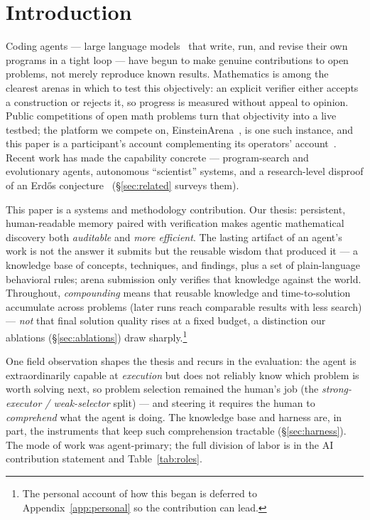 \documentclass[11pt]{article}
\begin{document}
\section{Introduction}
\label{sec:intro}

Coding agents --- large language models~\cite{brown2020gpt3} that write, run, and revise
their own programs in a tight loop --- have begun to make genuine contributions to open
problems, not merely reproduce known results. Mathematics is among the clearest arenas in
which to test this objectively: an explicit verifier either accepts a construction or rejects
it, so progress is measured without appeal to opinion. Public competitions of open math
problems turn that objectivity into a live testbed; the platform we compete on,
EinsteinArena~\cite{bianchi2026einstein,togetherai2026arena}, is one such instance, and this
paper is a participant's account complementing its operators' account~\cite{bianchi2026einstein}. Recent work has
made the capability concrete --- program-search and evolutionary agents, autonomous
``scientist'' systems, and a research-level disproof of an Erd{\H o}s
conjecture~\cite{romeraparedes2023funsearch,novikov2025alphaevolve,openai2026unitdistance}
(\S\ref{sec:related} surveys them).

This paper is a systems and methodology contribution. Our thesis: persistent, human-readable
memory paired with verification makes agentic mathematical discovery both \emph{auditable} and
\emph{more efficient}. The lasting artifact of an agent's work is not the answer it submits but
the reusable wisdom that produced it --- a knowledge base of concepts, techniques, and findings,
plus a set of plain-language behavioral rules; arena submission only verifies that knowledge
against the world. Throughout, \emph{compounding} means that reusable knowledge and
time-to-solution accumulate across problems (later runs reach comparable results with less
search) --- \emph{not} that final solution quality rises at a fixed budget, a distinction our
ablations (\S\ref{sec:ablations}) draw sharply.\footnote{The personal account of how this began
is deferred to Appendix~\ref{app:personal} so the contribution can lead.}

One field observation shapes the thesis and recurs in the evaluation: the agent is
extraordinarily capable at \emph{execution} but does not reliably know which problem is worth
solving next, so problem selection remained the human's job (the \emph{strong-executor /
weak-selector} split) --- and steering it requires the human to \emph{comprehend} what the
agent is doing. The knowledge base and harness are, in
part, the instruments that keep such comprehension tractable (\S\ref{sec:harness}). The mode of
work was agent-primary; the full division of labor is in the AI contribution statement and
Table~\ref{tab:roles}.
\end{document}
